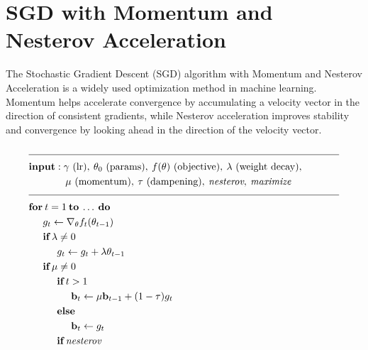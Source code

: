 \documentclass{article}
\begin{document}
\section*{SGD with Momentum and Nesterov Acceleration}

The Stochastic Gradient Descent (SGD) algorithm with Momentum and Nesterov Acceleration is a widely used optimization method in machine learning. Momentum helps accelerate convergence by accumulating a velocity vector in the direction of consistent gradients, while Nesterov acceleration improves stability and convergence by looking ahead in the direction of the velocity vector.

\[
\begin{aligned}
    & \rule{110mm}{0.4pt} \\
    & \textbf{input} : \gamma \text{ (lr)}, \: \theta_0 \text{ (params)}, \: f(\theta) \text{ (objective)}, \: \lambda \text{ (weight decay)}, \\
    & \hspace{13mm} \mu \text{ (momentum)}, \: \tau \text{ (dampening)}, \: \textit{nesterov}, \: \textit{maximize} \\[-1.ex]
    & \rule{110mm}{0.4pt} \\
    & \textbf{for} \: t=1 \: \textbf{to} \: \ldots \: \textbf{do} \\
    & \hspace{5mm} g_t \leftarrow \nabla_{\theta} f_t (\theta_{t-1}) \\
    & \hspace{5mm} \textbf{if} \: \lambda \neq 0 \\
    & \hspace{10mm} g_t \leftarrow g_t + \lambda \theta_{t-1} \\
    & \hspace{5mm} \textbf{if} \: \mu \neq 0 \\
    & \hspace{10mm} \textbf{if} \: t > 1 \\
    & \hspace{15mm} \textbf{b}_t \leftarrow \mu \textbf{b}_{t-1} + (1-\tau) g_t \\
    & \hspace{10mm} \textbf{else} \\
    & \hspace{15mm} \textbf{b}_t \leftarrow g_t \\
    & \hspace{10mm} \textbf{if} \: \textit{nesterov} \\

\end{aligned}\]
\end{document}
